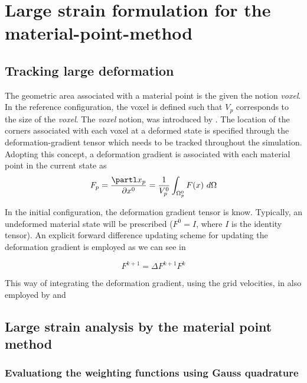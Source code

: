 
\section{Large strain formulation for the material-point-method}
\label{sec:large-stra-form}

\subsection{Tracking large deformation}
\label{sec:track-large-deform}

The geometric area associated with a material point is the given  the
notion \textit{voxel}. In the reference configuration, the voxel is
defined such that $V_p$ corresponds to the size of the
\textit{voxel}. The \textit{voxel} notion, was introduced by
\cite{Steffen2008}. The location of the corners associated with each
voxel at a deformed state is specified through the
deformation-gradient tensor which needs to be tracked throughout the
simulation.
Adopting this concept, a deformation gradient is associated with each
material point in the current state as
\begin{equation}
  \label{eq:def_gradient}
  F_p = \frac{\partl x_p}{\partial x^0} = \frac{1}{V_p^0}
  \int_{\Omega_p^0}F(x)\ d\Omega  
\end{equation}

In the initial configuration, the deformation gradient tensor is
know. Typically, an undeformed material state will be prescribed ($F^0
= I$, where $I$ is the identity tensor). An explicit forward
difference updating scheme for updating the deformation gradient is
employed as we can see in

\begin{equation}
  \label{eq:update_defor_grad}
  F^{k+1} = \Delta F^{k+1} F^{k}
\end{equation}



This way of integrating the deformation gradient, using the grid
velocities, in also employed by \cite{Guilkey2003} and
\cite{love_sulsky_2006}



\subsection{Large strain analysis by the material point method}
\label{sec:large-stra-analys}


\subsubsection{Evaluationg the weighting functions using Gauss
  quadrature}
\label{sec:eval-weight-funct}

